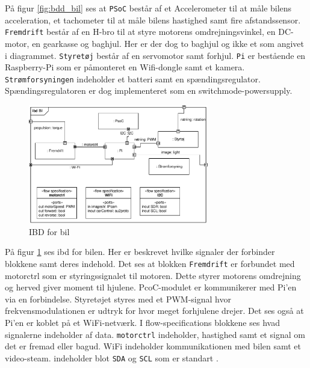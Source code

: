 På figur \ref{fig:bdd_bil} ses at \texttt{PSoC} består af et Accelerometer til at måle bilens acceleration, et tachometer til at måle bilens hastighed samt fire afstandssensor. 
\texttt{Fremdrift} består af en H-bro til at styre motorens omdrejningsvinkel, en DC-motor, en gearkasse og baghjul. 
Her er der dog to baghjul og ikke et som angivet i diagrammet. 
\texttt{Styretøj} består af en servomotor samt forhjul. 
\texttt{Pi} er bestående en  Raspberry-Pi som er påmonteret en Wifi-dongle samt et kamera. 
\texttt{Strømforsyningen} indeholder et batteri samt en spændingsregulator. Spændingsregulatoren er dog implementeret som en switchmode-powersupply.  

\begin{figure}[H]
\centering
\includegraphics[width=0.7\textwidth]{../fig/diagrammer/bil/ibd_bil.pdf}
\caption{IBD for bil}
\label{fig:ibd_bil}
\end{figure} 

På figur \ref{fig:ibd_bil} ses ibd for bilen. 
Her er beskrevet hvilke signaler der forbinder blokkene samt deres indehold. 
Det ses at blokken \texttt{Fremdrift} er forbundet med motorctrl som er styringssignalet til motoren. 
Dette styrer motorens omdrejning og herved giver moment til hjulene. 
PcoC-modulet er kommunikerer med Pi'en via en \IIC forbindelse. 
Styretøjet styres med et PWM-signal hvor frekvensmodulationen er udtryk for hvor meget forhjulene drejer. 
Det ses også at Pi'en er koblet på et WiFi-netværk. 
I flow-specifications blokkene ses hvad signalerne indeholder af data. 
\texttt{motorctrl} indeholder, hastighed samt et signal om det er fremad eller bagud. 
WiFi indeholder kommunikationen med bilen samt et video-steam. \IIC indeholder blot \texttt{SDA} og \texttt{SCL} som er standart \IIC. 

\clearpage